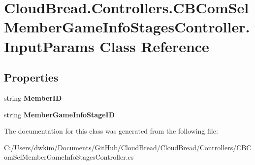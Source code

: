 \hypertarget{a00117}{}\section{Cloud\+Bread.\+Controllers.\+C\+B\+Com\+Sel\+Member\+Game\+Info\+Stages\+Controller.\+Input\+Params Class Reference}
\label{a00117}
\subsection*{Properties}
\begin{DoxyCompactItemize}
\item 
string {\bfseries Member\+ID}\hypertarget{a00117_adc78b193c3c7e35d9680416fc293af78}{}\label{a00117_adc78b193c3c7e35d9680416fc293af78}

\item 
string {\bfseries Member\+Game\+Info\+Stage\+ID}\hypertarget{a00117_ac661180cf0a0c02adc3fdfbe9a095502}{}\label{a00117_ac661180cf0a0c02adc3fdfbe9a095502}

\end{DoxyCompactItemize}


The documentation for this class was generated from the following file\+:\begin{DoxyCompactItemize}
\item 
C\+:/\+Users/dwkim/\+Documents/\+Git\+Hub/\+Cloud\+Bread/\+Cloud\+Bread/\+Controllers/C\+B\+Com\+Sel\+Member\+Game\+Info\+Stages\+Controller.\+cs\end{DoxyCompactItemize}

